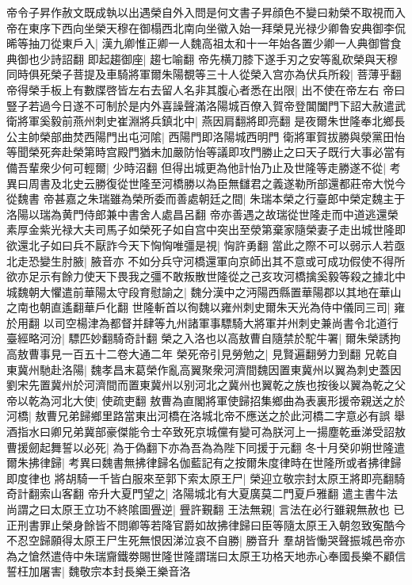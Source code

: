 帝令子昇作赦文既成執以出遇榮自外入問是何文書子昇顔色不變曰勑榮不取視而入帝在東序下西向坐榮天穆在御榻西北南向坐徽入始一拜榮見光禄少卿魯安典御李侃晞等抽刀從東戶入|{
	漢九卿惟正卿一人魏高祖太和十一年始各置少卿一人典御嘗食典御也少詩詔翻}
即起趨御座|{
	趨七喻翻}
帝先横刀膝下遂手刃之安等亂砍榮與天穆同時俱死榮子菩提及車騎將軍爾朱陽覩等三十人從榮入宫亦為伏兵所殺|{
	菩薄乎翻}
帝得榮手板上有數牒啓皆左右去留人名非其腹心者悉在出限|{
	出不使在帝左右}
帝曰豎子若過今日遂不可制於是内外喜譟聲滿洛陽城百僚入賀帝登閶闔門下詔大赦遣武衛將軍奚毅前燕州刺史崔淵將兵鎮北中|{
	燕因肩翻將即亮翻}
是夜爾朱世隆奉北鄉長公主帥榮部曲焚西陽門出屯河隂|{
	西陽門即洛陽城西明門}
衛將軍賀拔勝與滎黨田怡等聞榮死奔赴榮第時宫殿門猶未加嚴防怡等議即攻門勝止之曰天子既行大事必當有備吾輩衆少何可輕爾|{
	少時沼翻}
但得出城更為他計怡乃止及世隆等走勝遂不從|{
	考異曰周書及北史云勝復從世隆至河橋勝以為臣無讎君之義遂勒所部還都莊帝大悦今從魏書}
帝甚嘉之朱瑞雖為榮所委而善處朝廷之間|{
	朱瑞本榮之行臺郎中榮定魏主于洛陽以瑞為黄門侍郎兼中書舍人處昌呂翻}
帝亦善遇之故瑞從世隆走而中道逃還榮素厚金紫光禄大夫司馬子如榮死子如自宫中突出至滎第棄家隨榮妻子走出城世隆即欲還北子如曰兵不厭詐今天下恟恟唯彊是視|{
	恟許勇翻}
當此之際不可以弱示人若亟北走恐變生肘腋|{
	腋音亦}
不如分兵守河橋還軍向京師出其不意或可成功假使不得所欲亦足示有餘力使天下畏我之彊不敢叛散世隆從之己亥攻河橋擒奚毅等殺之據北中城魏朝大懼遣前華陽太守段育慰諭之|{
	魏分漢中之沔陽西縣置華陽郡以其地在華山之南也朝直遙翻華戶化翻}
世隆斬首以徇魏以雍州刺史爾朱天光為侍中儀同三司|{
	雍於用翻}
以司空楊津為都督并肆等九州諸軍事驃騎大將軍并州刺史兼尚書令北道行臺經略河汾|{
	驃匹妙翻騎奇計翻}
榮之入洛也以高敖曹自隨禁於駝牛署|{
	爾朱榮誘拘高敖曹事見一百五十二卷大通二年}
榮死帝引見勞勉之|{
	見賢遍翻勞力到翻}
兄乾自東冀州馳赴洛陽|{
	魏孝昌末葛榮作亂高翼聚衆河濟間魏因置東冀州以翼為刺史蓋因劉宋先置冀州於河濟間而置東冀州以别河北之冀州也翼乾之族也按後以翼為乾之父}
帝以乾為河北大使|{
	使疏吏翻}
敖曹為直閣將軍使歸招集鄉曲為表裏形援帝親送之於河橋|{
	敖曹兄弟歸鄉里路當東出河橋在洛城北帝不應送之於此河橋二字意必有誤}
舉酒指水曰卿兄弟冀部豪傑能令士卒致死京城儻有變可為朕河上一揚塵乾垂涕受詔敖曹援劒起舞誓以必死|{
	為于偽翻下亦為吾為為陛下同援于元翻}
冬十月癸卯朔世隆遣爾朱拂律歸|{
	考異曰魏書無拂律歸名伽藍記有之按爾朱度律時在世隆所或者拂律歸即度律也}
將胡騎一千皆白服來至郭下索太原王尸|{
	榮迎立敬宗封太原王將即亮翻騎奇計翻索山客翻}
帝升大夏門望之|{
	洛陽城北有大夏廣莫二門夏戶雅翻}
遣主書牛法尚謂之曰太原王立功不終隂圖舋逆|{
	舋許覲翻}
王法無親|{
	言法在必行雖親無赦也}
已正刑書罪止榮身餘皆不問卿等若降官爵如故拂律歸曰臣等隨太原王入朝忽致寃酷今不忍空歸願得太原王尸生死無恨因涕泣哀不自勝|{
	勝音升}
羣胡皆慟哭聲振城邑帝亦為之愴然遣侍中朱瑞齎鐵劵賜世隆世隆謂瑞曰太原王功格天地赤心奉國長樂不顧信誓枉加屠害|{
	魏敬宗本封長樂王樂音洛}
